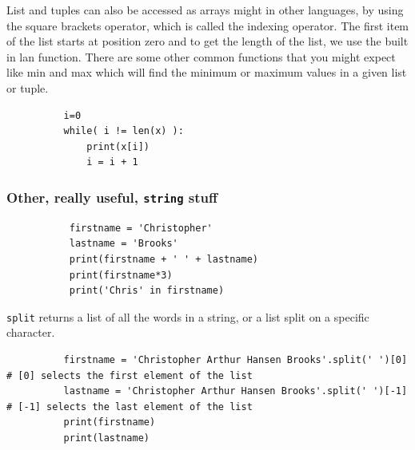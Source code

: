 \documentclass[11pt]{article}
\begin{document}
        List and tuples can also be accessed as arrays might in other
        languages, by using the square brackets operator, which is called the
        indexing operator. The first item of the list starts at position zero
        and to get the length of the list, we use the built in lan
        function. There are some other common functions that you might expect
        like min and max which will find the minimum or maximum values in a
        given list or tuple.
        \begin{lstlisting}
          i=0
          while( i != len(x) ):
              print(x[i])
              i = i + 1
          \end{lstlisting}

        \subsubsection{Other, really useful, {\tt string} stuff}
        \begin{lstlisting}
           firstname = 'Christopher'
           lastname = 'Brooks'
           print(firstname + ' ' + lastname)
           print(firstname*3)
           print('Chris' in firstname)
        \end{lstlisting}
        {\tt split} returns a list of all the words in a string, or a list split on a specific character.
        \begin{lstlisting}
          firstname = 'Christopher Arthur Hansen Brooks'.split(' ')[0] # [0] selects the first element of the list
          lastname = 'Christopher Arthur Hansen Brooks'.split(' ')[-1] # [-1] selects the last element of the list
          print(firstname)
          print(lastname)
          \end{lstlisting}
\end{document}

